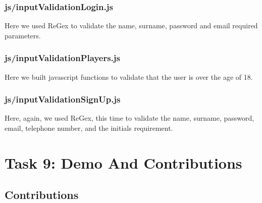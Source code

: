 \documentclass[titlepage]{article}
\begin{document}
\subsubsection{js/inputValidationLogin.js}
Here we used ReGex to validate the name, surname, password and email required parameters.
\vspace{1em}
\subsubsection{js/inputValidationPlayers.js}
Here we built javascript functions to validate that the user is over the age of 18. 
\vspace{1em}
\subsubsection{js/inputValidationSignUp.js}
Here, again, we used ReGex, this time to validate the name, surname, password, email, telephone number,
and the initials requirement.

\newpage


\section{Task 9: Demo And Contributions}
\vspace{1em}
\subsection{Contributions}
\vspace{1em}
\end{document}

